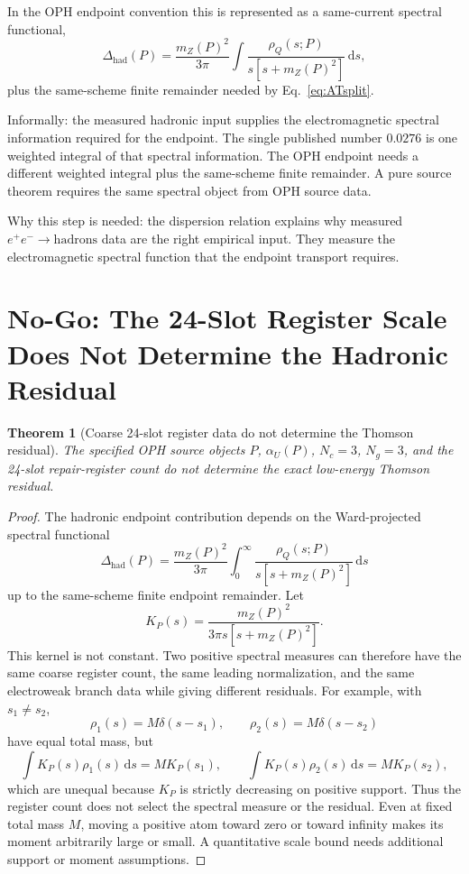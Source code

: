 \documentclass[11pt]{article}
\newtheorem{theorem}{Theorem}
\theoremstyle{remark}
\newcommand{\dd}{\,\mathrm d}
\newcommand{\Dhad}{\Delta_{\mathrm{had}}}
\begin{document}
In the OPH endpoint convention this is represented as a same-current spectral functional,
\begin{equation}
\Dhad(P)
=
\frac{m_Z(P)^2}{3\pi}
\int \frac{\rho_Q(s;P)}{s[s+m_Z(P)^2]}\dd s,
\label{eq:ophhadron}
\end{equation}
plus the same-scheme finite remainder needed by Eq.~\eqref{eq:ATsplit}.

Informally: the measured hadronic input supplies the electromagnetic spectral information required for the endpoint. The single published number \(0.0276\) is one weighted integral of that spectral information. The OPH endpoint needs a different weighted integral plus the same-scheme finite remainder. A pure source theorem requires the same spectral object from OPH source data.

Why this step is needed: the dispersion relation explains why measured \(e^+e^-\to\mathrm{hadrons}\) data are the right empirical input. They measure the electromagnetic spectral function that the endpoint transport requires.

\section{No-Go: The 24-Slot Register Scale Does Not Determine the Hadronic Residual}

\begin{theorem}[Coarse 24-slot register data do not determine the Thomson residual]
The specified OPH source objects \(P\), \(\alpha_U(P)\), \(N_c=3\), \(N_g=3\), and the
24-slot repair-register count do not determine the exact low-energy Thomson residual.
\end{theorem}

\begin{proof}
The hadronic endpoint contribution depends on the Ward-projected spectral functional
\begin{equation}
\Delta_{\mathrm{had}}(P)
=
\frac{m_Z(P)^2}{3\pi}
\int_0^\infty
\frac{\rho_Q(s;P)}{s[s+m_Z(P)^2]}\dd s
\label{eq:hadronkernelnogo}
\end{equation}
up to the same-scheme finite endpoint remainder. Let
\[
K_P(s)=\frac{m_Z(P)^2}{3\pi s[s+m_Z(P)^2]}.
\]
This kernel is not constant. Two positive spectral measures can therefore have the same coarse
register count, the same leading normalization, and the same electroweak branch data while giving
different residuals. For example, with \(s_1\ne s_2\),
\[
\rho_1(s)=M\delta(s-s_1),
\qquad
\rho_2(s)=M\delta(s-s_2)
\]
have equal total mass, but
\[
\int K_P(s)\rho_1(s)\dd s=M K_P(s_1),
\qquad
\int K_P(s)\rho_2(s)\dd s=M K_P(s_2),
\]
which are unequal because \(K_P\) is strictly decreasing on positive support.
Thus the register count does not select the spectral measure or the residual.
Even at fixed total mass \(M\), moving a positive atom toward zero or toward
infinity makes its moment arbitrarily large or small. A quantitative scale
bound needs additional support or moment assumptions.
\end{proof}
\end{document}
